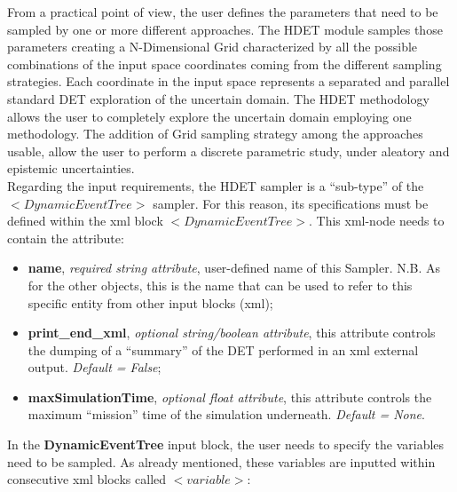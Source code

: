 From a practical point of view, the user defines the parameters that need to be sampled by one or more different approaches. The HDET module samples those parameters creating a N-Dimensional Grid characterized by all the possible combinations of the input space coordinates coming from the different sampling strategies. Each coordinate in the input space represents a separated and parallel standard DET exploration of the uncertain domain. 
The HDET methodology allows the user to completely explore the uncertain domain employing one methodology. The addition of Grid sampling strategy among the approaches usable, allow the user to perform a discrete parametric study, under aleatory and epistemic uncertainties.
\\ Regarding the input requirements, the HDET sampler is a ``sub-type'' of the  $<DynamicEventTree>$ sampler. 
For this reason, its specifications  must be defined within the xml block $<DynamicEventTree>$. This xml-node needs to contain the attribute:
\begin{itemize}
\itemsep0em
\item \textbf{name}, \textit{required string attribute}, user-defined name of this Sampler. N.B. As for the other objects, this is the name that can be used to refer to this specific entity from other input blocks (xml);
\item \textbf{print\_end\_xml}, \textit{optional string/boolean attribute}, this attribute controls the dumping of a ``summary'' of the DET performed in an xml external output. \textit{Default = False};
\item \textbf{maxSimulationTime}, \textit{optional float attribute}, this attribute controls the maximum ``mission'' time of the simulation underneath. \textit{Default = None}.
\end{itemize}
In the \textbf{DynamicEventTree} input block, the user needs to specify the variables need to be sampled. As already mentioned, these variables are inputted within consecutive xml blocks called $<variable>$:
